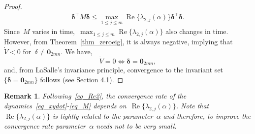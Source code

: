 \documentclass[letterpaper, 10pt, conference]{ieeeconf}
\newtheorem{rem}{Remark}
\def\mb{\mathbf}
\begin{document}
\begin{proof}
\begin{eqnarray}
	\boldsymbol{\delta}^\top M \boldsymbol{\delta} \leq \max_{1\leq j\leq m}\operatorname{Re}\{{\lambda}_{2,j}(\alpha)\} \boldsymbol{\delta}^\top  \boldsymbol{\delta}. 
\end{eqnarray}
Since~$M$ varies in time,~$\max_{1\leq j\leq m}\operatorname{Re}\{{\lambda}_{2,j}(\alpha)\}$ also changes in time. However, from Theorem~\ref{thm_zeroeig}, it is always negative, implying that~$\dot{V}< 0$ for~$\delta \neq \mb{0}_{2mn}$. 
We have,
\[\dot{V} =  0 \Leftrightarrow \boldsymbol{\delta} = \mb{0}_{2mn},
\] 
and, from LaSalle’s invariance principle, convergence to the invariant set~$\{\boldsymbol{\delta} = \mb{0}_{2mn}\}$ follows (see \cite{mesbahi2010graph} Section 4.1).
\end{proof}

\begin{rem}
 	Following~\eqref{eq_Re2}, the convergence rate of the dynamics~\eqref{eq_xydot}-\eqref{eq_M} depends on~$\operatorname{Re}\{{\lambda}_{2,j}(\alpha)\}$. Note that~$\operatorname{Re}\{{\lambda}_{2,j}(\alpha)\}$ is tightly related to the parameter~$\alpha$ and therefore, to improve the convergence rate parameter~$\alpha$ needs not to be very small. 
\end{rem}
\end{document}

